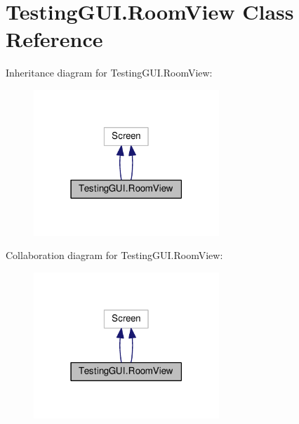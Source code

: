 \hypertarget{classTestingGUI_1_1RoomView}{}\section{Testing\+G\+U\+I.\+Room\+View Class Reference}
\label{classTestingGUI_1_1RoomView}


Inheritance diagram for Testing\+G\+U\+I.\+Room\+View\+:
\nopagebreak
\begin{figure}[H]
\begin{center}
\leavevmode
\includegraphics[width=198pt]{classTestingGUI_1_1RoomView__inherit__graph}
\end{center}
\end{figure}


Collaboration diagram for Testing\+G\+U\+I.\+Room\+View\+:
\nopagebreak
\begin{figure}[H]
\begin{center}
\leavevmode
\includegraphics[width=198pt]{classTestingGUI_1_1RoomView__coll__graph}
\end{center}
\end{figure}
